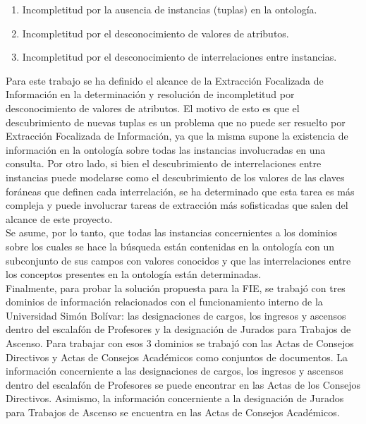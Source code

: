 \begin{enumerate}
\item Incompletitud por la ausencia de instancias (tuplas) en la ontología. 
\item Incompletitud por el desconocimiento de valores de atributos. 
\item Incompletitud por el desconocimiento de interrelaciones entre instancias.
\end{enumerate}

Para este trabajo se ha definido el alcance de la Extracción Focalizada de Información en la determinación y resolución de incompletitud por desconocimiento de valores de atributos. El motivo de esto es que el descubrimiento de nuevas tuplas es un problema que no puede ser resuelto por Extracción Focalizada de Información, ya que la misma supone la existencia de información en la ontología sobre todas las instancias involucradas en una consulta. Por otro lado, si bien el descubrimiento de interrelaciones entre instancias puede modelarse como el descubrimiento de los valores de las claves foráneas que definen cada interrelación, se ha determinado que esta tarea es más compleja y puede involucrar tareas de extracción más sofisticadas que salen del alcance de este proyecto.\\

Se asume, por lo tanto, que todas las instancias concernientes a los dominios sobre los cuales se hace la búsqueda están contenidas en la ontología con un subconjunto de sus campos con valores conocidos y que las interrelaciones entre los conceptos presentes en la ontología están determinadas.\\

Finalmente, para probar la solución propuesta para la FIE, se trabajó con tres dominios de información relacionados con el funcionamiento interno de la Universidad Simón Bolívar: las designaciones de cargos, los ingresos y ascensos dentro del escalafón de Profesores y la designación de Jurados para Trabajos de Ascenso. Para trabajar con esos 3 dominios se trabajó con las Actas de Consejos Directivos y Actas de Consejos Académicos como conjuntos de documentos. La información concerniente a las designaciones de cargos, los ingresos y ascensos dentro del escalafón de Profesores se puede encontrar en las Actas de los Consejos Directivos. Asimismo, la información concerniente a la designación de Jurados para Trabajos de Ascenso se encuentra en las Actas de Consejos 
Académicos. \\

\\